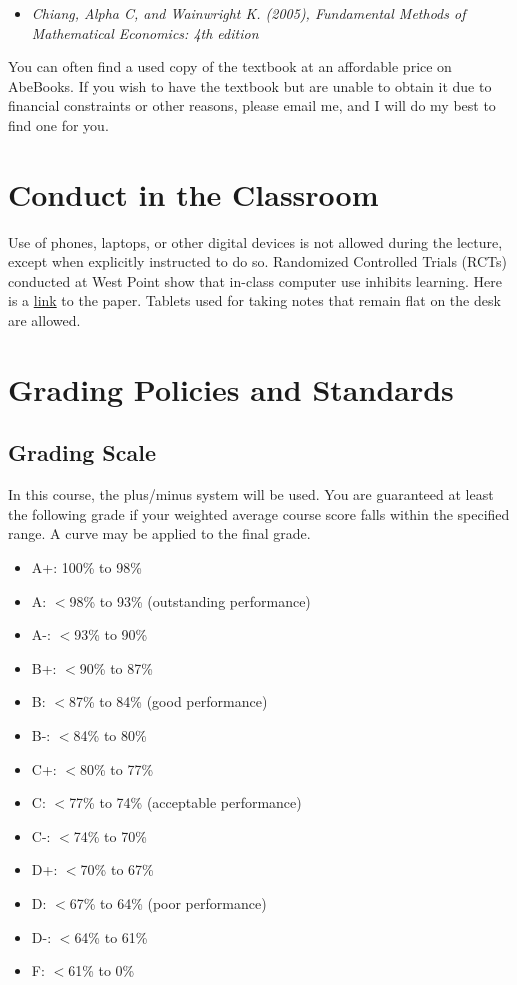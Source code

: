 \documentclass{./../latex/syllabus}
\begin{document}
\begin{itemize}
  \item \textit{Chiang, Alpha C, and Wainwright K. (2005), Fundamental Methods of Mathematical Economics: 4th edition}
\end{itemize}

You can often find a used copy of the textbook at an affordable price on AbeBooks. If you wish to have the textbook but are unable to obtain it due to financial constraints or other reasons, please email me, and I will do my best to find one for you.

\section*{Conduct in the Classroom}
Use of phones, laptops, or other digital devices is not allowed during the lecture, except when explicitly instructed to do so. Randomized Controlled Trials (RCTs) conducted at West Point show that in-class computer use inhibits learning. Here is a \href{https://oema.army.mil/pub/2017_Carter_Greenberg_Walker_Computer_Usage_RCT_USMA.pdf}{link} to the paper. Tablets used for taking notes that remain flat on the desk are allowed.

\section*{Grading Policies and Standards}

\subsection*{Grading Scale}

In this course, the plus/minus system will be used. You are guaranteed at least the following grade if your weighted average course score falls within the specified range. A curve may be applied to the final grade.

{
\begin{itemize}[nosep]
\item[] A+: 100\% to 98\%
\item[] A: $<$98\% to 93\% (outstanding performance)
\item[] A-: $<$93\% to 90\%
\item[] B+: $<$90\% to 87\%
\item[] B: $<$87\% to 84\% (good performance)
\item[] B-: $<$84\% to 80\%
\item[] C+: $<$80\% to 77\%
\item[] C: $<$77\% to 74\% (acceptable performance)
\item[] C-: $<$74\% to 70\%
\item[] D+: $<$70\% to 67\%
\item[] D: $<$67\% to 64\% (poor performance)
\item[] D-: $<$64\% to 61\%
\item[] F: $<$61\% to 0\%
\end{itemize}}
\end{document}
